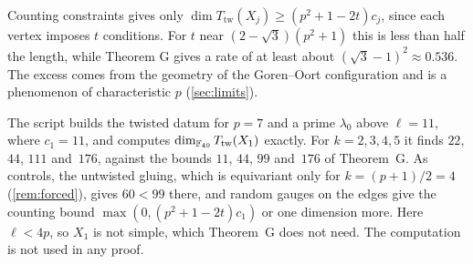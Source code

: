 Counting constraints gives only $\dim T_{\mathrm{tw}}(X_j)\ge(p^2+1-2t)c_j$, since each vertex imposes $t$ conditions. For
$t$ near $(2-\sqrt3)(p^2+1)$ this is less than half the length, while Theorem G gives a rate of at least about
$(\sqrt3-1)^2\approx0.536$. The excess comes from the geometry of the Goren--Oort configuration and is a phenomenon of
characteristic $p$ (\cref{sec:limits}).

\begin{remark}\label{rem:numericalG}
The script  builds the twisted datum for $p=7$ and a prime $\lambda_0$ above $\ell=11$,
where $c_1=11$, and computes $\dim_{\mathbb{F}_{49}}T_{\mathrm{tw}}(X_1)$ exactly. For $k=2,3,4,5$ it finds $22$, $44$, $111$
and~$176$, against the bounds $11$, $44$, $99$ and~$176$ of Theorem~G. As controls, the untwisted gluing, which is
equivariant only for $k=(p+1)/2=4$ (\cref{rem:forced}), gives $60<99$ there, and random gauges on the edges give the
counting bound $\max(0,(p^2+1-2t)c_1)$ or one dimension more. Here $\ell<4p$, so $X_1$ is not simple, which Theorem~G
does not need. The computation is not used in any proof.
\end{remark}
